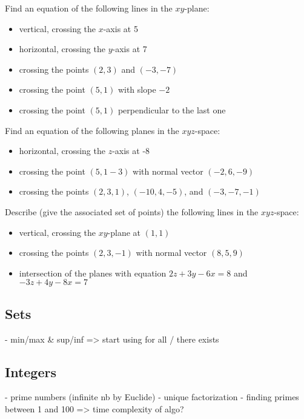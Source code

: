 \begin{question} Find an equation of the following lines in the $xy$-plane:
    \begin{itemize}
        \item vertical, crossing the $x$-axis at 5
        \item horizontal, crossing the $y$-axis at 7
        \item crossing the points $(2,3)$ and $(-3,-7)$
        \item crossing the point $(5,1)$ with slope $-2$
        \item crossing the point $(5,1)$ perpendicular to the last one
    \end{itemize}
\end{question}
\begin{question} Find an equation of the following planes in the $xyz$-space:
    \begin{itemize}
        \item horizontal, crossing the $z$-axis at -8
        \item crossing the point $(5,1-3)$ with normal vector $(-2,6,-9)$
        \item crossing the points $(2,3,1)$, $(-10,4,-5)$, and $(-3,-7,-1)$
    \end{itemize}
\end{question}
\begin{question} Describe (give the associated set of points) the following lines in the $xyz$-space:
    \begin{itemize}
        \item vertical, crossing the $xy$-plane at $(1,1)$
        \item crossing the points $(2,3,-1)$ with normal vector $(8,5,9)$
        \item intersection of the planes with equation $2z+3y-6x=8$ and $-3z+4y-8x=7$
    \end{itemize}
\end{question}



\subsection{Sets}
- min/max \& sup/inf => start using for all / there exists
\subsection{Integers}
- prime numbers (infinite nb by Euclide)
- unique factorization 
- finding primes between 1 and 100 => time complexity of algo?